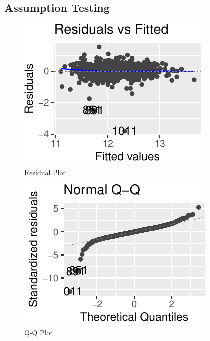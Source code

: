 \documentclass[letterpaper,9pt,twocolumn,twoside,]{pinp}
\begin{document}
\hypertarget{assumption-testing}{%
\subsection{Assumption Testing}\label{assumption-testing}}

\begin{figure}

{\centering \includegraphics{Executive_Summary_files/figure-latex/fig1-1} 

}

\caption{Residual Plot}\label{fig:fig1}
\end{figure}

\begin{figure}

{\centering \includegraphics{Executive_Summary_files/figure-latex/fig2-1} 

}

\caption{Q-Q Plot}\label{fig:fig2}
\end{figure}
\end{document}
